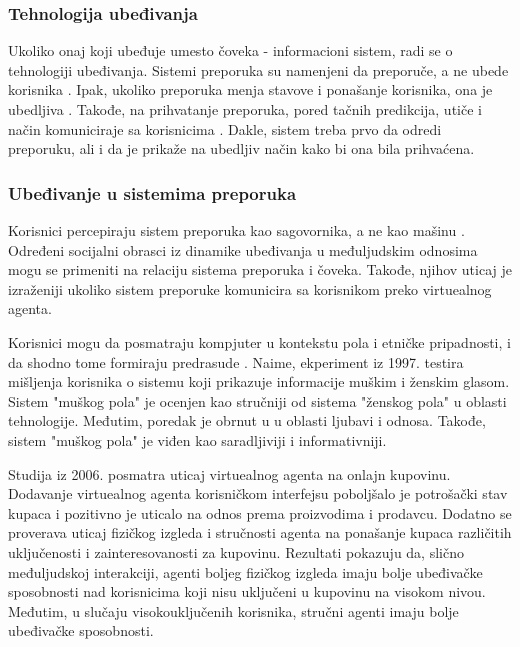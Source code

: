 \documentclass[a4paper]{article}
\begin{document}
\subsubsection{Tehnologija ubeđivanja}
Ukoliko onaj koji ubeđuje umesto čoveka - informacioni sistem, radi se o tehnologiji ubeđivanja. Sistemi preporuka su namenjeni da preporuče, a ne ubede korisnika \cite{Alslaity_Tran_2019}. Ipak, ukoliko preporuka menja stavove i ponašanje korisnika, ona je ubedljiva \cite{Yoo_Gretzel_Zanker_2013}. Takođe, na prihvatanje preporuka, pored tačnih predikcija, utiče i način komuniciraje sa korisnicima \cite{Alslaity_Tran_2021}. Dakle, sistem treba prvo da odredi preporuku, ali i da je prikaže na ubedljiv način kako bi ona bila prihvaćena.

\subsubsection{Ubeđivanje u sistemima preporuka}
Korisnici percepiraju sistem preporuka kao sagovornika, a ne kao mašinu \cite{Yoo_Gretzel_Zanker_2013}. Određeni socijalni obrasci iz dinamike ubeđivanja u međuljudskim odnosima mogu se primeniti na relaciju sistema preporuka i čoveka. Takođe, njihov uticaj je izraženiji ukoliko sistem preporuke komunicira sa korisnikom preko virtuealnog agenta.

Korisnici mogu da posmatraju kompjuter u kontekstu pola i etničke pripadnosti, i da shodno tome formiraju predrasude \cite{Nass_Moon_Green_1997}. Naime, ekperiment iz 1997. testira mišljenja korisnika o sistemu koji prikazuje informacije muškim i ženskim glasom. Sistem "muškog pola" je ocenjen kao stručniji od sistema "ženskog pola" u oblasti tehnologije. Međutim, poredak je obrnut u u oblasti ljubavi i odnosa. Takođe, sistem "muškog pola" je viđen kao saradljiviji i informativniji.

Studija iz 2006. \cite{Holzwarth_Janiszewski_Neumann_2006} posmatra uticaj virtuealnog agenta na onlajn kupovinu. Dodavanje virtuealnog agenta korisničkom interfejsu poboljšalo je potrošački stav kupaca i pozitivno je uticalo na odnos prema proizvodima i prodavcu. Dodatno se proverava uticaj fizičkog izgleda i stručnosti agenta na ponašanje kupaca različitih uključenosti i zainteresovanosti za kupovinu. Rezultati pokazuju da, slično međuljudskoj interakciji, agenti boljeg fizičkog izgleda imaju bolje ubeđivačke sposobnosti nad korisnicima koji nisu uključeni u kupovinu na visokom nivou. Međutim, u slučaju visokouključenih korisnika, stručni agenti imaju bolje ubeđivačke sposobnosti.
\end{document}
